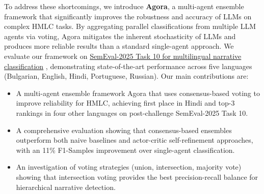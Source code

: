 To address these shortcomings, we introduce \textbf{Agora}, a multi-agent ensemble framework that significantly improves the robustness and accuracy of LLMs on complex HMLC tasks. 
By aggregating parallel classifications from multiple LLM agents via voting, Agora mitigates the inherent stochasticity of LLMs and produces more reliable results than a standard single-agent approach. 
We evaluate our framework on \href{https://propaganda.math.unipd.it/semeval2025task10/index.html}{SemEval-2025 Task 10 for multilingual narrative classification} \citep{semeval2025task10}, demonstrating state-of-the-art performance across five languages (Bulgarian, English, Hindi, Portuguese, Russian). 
Our main contributions are:
\begin{itemize}
\item A multi-agent ensemble framework Agora that uses consensus-based voting to improve reliability for HMLC, achieving first place in Hindi and top-3 rankings in four other languages on post-challenge SemEval-2025 Task 10.
\item A comprehensive evaluation showing that consensus-based ensembles outperform both naive baselines and actor-critic self-refinement approaches, with an 11\% F1-Samples improvement over single-agent classification.
\item An investigation of voting strategies (union, intersection, majority vote) showing that intersection voting provides the best precision-recall balance for hierarchical narrative detection.
\end{itemize}